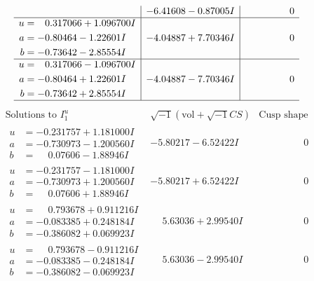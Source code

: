 \documentclass[1p]{elsarticle_modified}
\theoremstyle{definition}
\newcommand{\I}{\sqrt{-1}}
\begin{document}
$$\begin{array}{c|c|c}
 & -6.41608 - 0.87005 I & \phantom{-0.000000 } 0 \\ \hline\begin{aligned}
u &= \phantom{-}0.317066 + 1.096700 I \\
a &= -0.80464 - 1.22601 I \\
b &= -0.73642 - 2.85554 I\end{aligned}
 & -4.04887 + 7.70346 I & \phantom{-0.000000 } 0 \\ \hline\begin{aligned}
u &= \phantom{-}0.317066 - 1.096700 I \\
a &= -0.80464 + 1.22601 I \\
b &= -0.73642 + 2.85554 I\end{aligned}
 & -4.04887 - 7.70346 I & \phantom{-0.000000 } 0\\
 \hline 
 \end{array}$$\newpage$$\begin{array}{c|c|c}  
\text{Solutions to }I^u_{1}& \I (\text{vol} + \sqrt{-1}CS) & \text{Cusp shape}\\
 \hline 
\begin{aligned}
u &= -0.231757 + 1.181000 I \\
a &= -0.730973 - 1.200560 I \\
b &= \phantom{-}0.07606 - 1.88946 I\end{aligned}
 & -5.80217 - 6.52422 I & \phantom{-0.000000 } 0 \\ \hline\begin{aligned}
u &= -0.231757 - 1.181000 I \\
a &= -0.730973 + 1.200560 I \\
b &= \phantom{-}0.07606 + 1.88946 I\end{aligned}
 & -5.80217 + 6.52422 I & \phantom{-0.000000 } 0 \\ \hline\begin{aligned}
u &= \phantom{-}0.793678 + 0.911216 I \\
a &= -0.083385 + 0.248184 I \\
b &= -0.386082 + 0.069923 I\end{aligned}
 & \phantom{-}5.63036 + 2.99540 I & \phantom{-0.000000 } 0 \\ \hline\begin{aligned}
u &= \phantom{-}0.793678 - 0.911216 I \\
a &= -0.083385 - 0.248184 I \\
b &= -0.386082 - 0.069923 I\end{aligned}
 & \phantom{-}5.63036 - 2.99540 I & \phantom{-0.000000 } 0 \\ \hline\begin{aligned}

\end{aligned}
\end{array}$$
\end{document}
